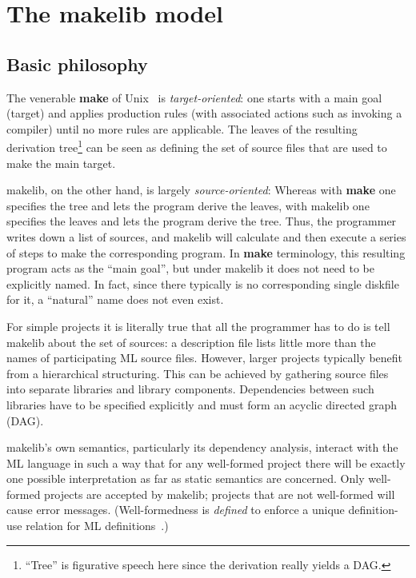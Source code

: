 
\section{The makelib model}

\subsection{Basic philosophy}

The venerable {\bf make} of Unix~\cite{feldman79} is {\em
target-oriented}\/: one starts with a main goal (target) and applies
production rules (with associated actions such as invoking a compiler)
until no more rules are applicable. The leaves of the resulting
derivation tree\footnote{``Tree'' is figurative speech here since the
derivation really yields a DAG.} can be seen as defining the set of
source files that are used to make the main target.

makelib, on the other hand, is largely {\em source-oriented}\/: Whereas
with {\bf make} one specifies the tree and lets the program derive the
leaves, with makelib one specifies the leaves and lets the program derive
the tree.  Thus, the programmer writes down a list of sources, and makelib
will calculate and then execute a series of steps to make the
corresponding program.  In {\bf make} terminology, this resulting
program acts as the ``main goal'', but under makelib it does not need to be
explicitly named.  In fact, since there typically is no corresponding
single diskfile for it, a ``natural'' name does not even exist.

For simple projects it is literally true that all the programmer has
to do is tell makelib about the set of sources: a description file lists
little more than the names of participating ML source files. However,
larger projects typically benefit from a hierarchical structuring.
This can be achieved by gathering source files into separate
libraries and library components.  Dependencies between such libraries
have to be specified explicitly and must form an acyclic directed
graph (DAG).

makelib's own semantics, particularly its dependency analysis, interact
with the ML language in such a way that for any well-formed project
there will be exactly one possible interpretation as far as static
semantics are concerned.  Only well-formed projects are accepted by
makelib; projects that are not well-formed will cause error messages.
(Well-formedness is {\em defined} to enforce a unique definition-use
relation for ML definitions~\cite{blume:depend99}.)


